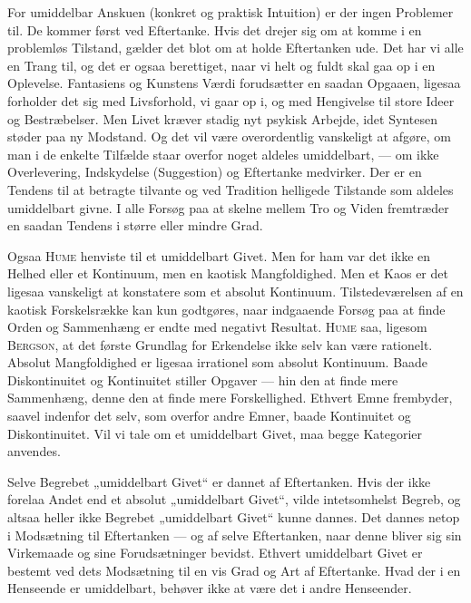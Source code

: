 \documentclass[12pt]{article}
\begin{document}
For umiddelbar Anskuen (konkret og praktisk Intuition) er der ingen Problemer
til. De kommer først ved Eftertanke. Hvis det drejer sig om at komme
i en problemløs Tilstand, gælder det blot om at holde Eftertanken ude. Det har
vi alle en Trang til, og det er ogsaa berettiget, naar vi helt og fuldt skal gaa op i
en Oplevelse. Fantasiens og Kunstens Værdi forudsætter en saadan Opgaaen, ligesaa
forholder det sig med Livsforhold, vi gaar op i, og med Hengivelse til store
Ideer og Bestræbelser. Men Livet kræver stadig nyt psykisk Arbejde, idet Syntesen
støder paa ny Modstand. Og det vil være overordentlig vanskeligt at afgøre,
om man i de enkelte Tilfælde staar overfor noget aldeles umiddelbart, --- om ikke
Overlevering, Indskydelse (Suggestion) og Eftertanke medvirker. Der er en Tendens
til at betragte tilvante og ved Tradition helligede Tilstande som aldeles
umiddelbart givne. I alle Forsøg paa at skelne mellem Tro og Viden fremtræder en
saadan Tendens i større eller mindre Grad.

Ogsaa \textsc{Hume} henviste til et umiddelbart Givet. Men for ham var det ikke en
Helhed eller et Kontinuum, men en kaotisk Mangfoldighed. Men et Kaos er det
ligesaa vanskeligt at konstatere som et absolut Kontinuum. Tilstedeværelsen af en
kaotisk Forskelsrække kan kun godtgøres, naar indgaaende Forsøg paa at finde
Orden og Sammenhæng er endte med negativt Resultat. \textsc{Hume} saa, ligesom
\textsc{Bergson}, at det første Grundlag for Erkendelse ikke selv kan være rationelt.
Absolut Mangfoldighed er ligesaa irrationel som absolut Kontinuum. Baade Diskontinuitet
og Kontinuitet stiller Opgaver --- hin den at finde mere Sammenhæng, denne den
at finde mere Forskellighed. Ethvert Emne frembyder, saavel indenfor det selv,
som overfor andre Emner, baade Kontinuitet og Diskontinuitet. Vil vi tale om
et umiddelbart Givet, maa begge Kategorier anvendes.

Selve Begrebet „umiddelbart Givet“ er dannet af Eftertanken. Hvis der ikke
forelaa Andet end et absolut „umiddelbart Givet“, vilde intetsomhelst Begreb, og
altsaa heller ikke Begrebet „umiddelbart Givet“ kunne dannes. Det dannes netop
i Modsætning til Eftertanken --- og af selve Eftertanken, naar denne bliver sig sin
Virkemaade og sine Forudsætninger bevidst. Ethvert umiddelbart Givet er bestemt
ved dets Modsætning til en vis Grad og Art af Eftertanke. Hvad der i en
Henseende er umiddelbart, behøver ikke at være det i andre Henseender.
\end{document}

